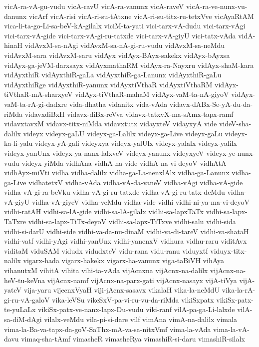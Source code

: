 {vicA-ra-vA-gu-vudu
vicA-ravU
vicA-ra-vanunx
vicA-raveV
vicA-ra-ve-nunx-vu-danunx
vicArf
vicA-risi
vicA-ri-su-tAtxne
vicA-ri-su-titx-ru-tetxVve
vicAyaRtAM
vica-li-ta-go-Li-sa-beV-kA-gilalx
viciM-ta-yati
vici-tarx-vA-dudu
vici-tarx-vAgi
vici-tarx-vA-gide
vici-tarx-vA-gi-ru-tatxde
vici-tarx-vA-giyU
vici-tatx-vAda
vidA-hinaH
vidAvxM-sa-nAgi
vidAvxM-sa-nA-gi-ru-vudu
vidAvxM-sa-neMdu
vidAvxM-sara
vidAvxM-saru
vidAyx
vidAyx-BAyx-sakekx
vidAyx-bAyxsa
vidAyx-ga-jeVM-darxsayx
vidAyxmathaRM
vidAyx-ra-Nayxru
vidAyx-shaM-kara
vidAyxthiR
vidAyxthiR-gaLa
vidAyxthiR-ga-Lanunx
vidAyxthiR-gaLu
vidAyxthiRge
vidAyxthiR-yanunx
vidAyxtiVthaR
vidAyxtiVthaRM
vidAyx-tiVthaR-mA-sharxyeV
vidAyx-tiVthaR-mahaM
vidAyx-vaM-ta-nA-giyoV
vidAyx-vaM-ta-rA-gi-dadxre
vida-dhatha
vidanitx
vida-vAda
vidavx-dABx-Se-yA-du-da-riMda
vidavxdiBxH
vidavx-diBx-reVva
vidavx-tatxvX-ma-sAmx-tapx-ramf
vidavxtavxM
vidavx-titx-niMda
vidavxtutx
vidayxteV
vidayxyA
vide
videV-sha-dalilx
videyx
videyx-gaLU
videyx-ga-Lalilx
videyx-ga-Live
videyx-gaLu
videyx-ka-li-yalu
videyx-yA-gali
videyxya
videyx-yalUlx
videyx-yalalx
videyx-yalilx
videyx-yanUnx
videyx-ya-nanx-lalxveV
videyx-yanunx
videyxyeV
videyx-ye-nunx-vudu
videyx-yiMda
vidhAna
vidhA-na-vide
vidhA-na-vi-deyoV
vidhAtA
vidhAyx-miVti
vidha
vidha-dalilx
vidha-ga-La-nenxlAlx
vidha-ga-Lanunx
vidha-ga-Live
vidhatetxV
vidha-vAda
vidha-vA-da-vaneV
vidha-vAgi
vidha-vA-gide
vidha-vA-gi-ra-beVku
vidha-vA-gi-ru-tatxde
vidha-vA-gi-ru-tatx-deMdu
vidha-vA-giyU
vidha-vA-giyeV
vidha-veMdu
vidha-vide
vidhi
vidhi-ni-ya-ma-vi-deyoV
vidhi-ratAH
vidhi-sa-lA-gide
vidhi-sa-lA-gilalx
vidhi-sa-lapxTaTx
vidhi-sa-lapx-TaTxre
vidhi-sa-lapx-TiTx-deyoV
vidhi-sa-lapx-TiTxve
vidhi-salu
vidhi-sida
vidhi-si-darU
vidhi-side
vidhi-va-da-nu-dinaM
vidhi-va-di-tareV
vidhi-va-shataH
vidhi-vatf
vidhi-yAgi
vidhi-yanUnx
vidhi-yanenxV
vidhura
vidhu-raru
viditAvx
viditaM
viduSAM
vidudx
vidudxteV
vidu-rana
vidu-ranu
viduyxtf
viduyx-titx-nalilx
vigarx-hada
vigarx-hakekx
vigarx-ha-vanunx
viga-taBiVH
vihAya
vihanutxM
vihitA
vihita
vihi-ta-vAda
vijAcnxna
vijAcnx-na-dalilx
vijAcnx-na-heV-tu-keVna
vijAcnx-namf
vijAcnx-na-parx-gati
vijAcnx-nasayx
vijA-tiVya
vijA-yateV
vija-yaru
vijecnxVyaH
viji-jAcnx-sasavx
vikalaH
vika-la-neMdU
vika-la-rA-gi-ru-vA-galoV
vika-leVSu
vikeSxV-pa-vi-ru-vu-da-riMda
vikiSxpatx
vikiSx-patx-te-yuLaLx
vikiSx-patx-ve-nanx-lapx-Du-vudu
viki-ranf
vilA-pa-ga-Li-lalxde
vilA-sa-diM-dAgi
vilalx-veMdu
vila-pi-si-dare
vilf
vimAna
vimA-na-dalilx
vimala
vima-la-Ba-va-tapx-da-goV-SaThx-mA-va-sa-nitxVmf
vima-la-vAda
vima-la-vA-davu
vimaq-sha-tAmf
vimasheR
vimasheRya
vimashiR-si-daru
vimashiR-silalx
}

